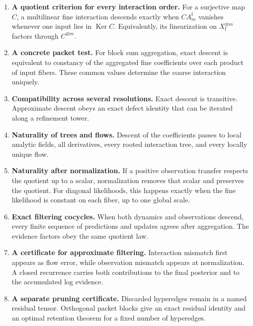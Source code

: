 \documentclass[11pt]{article}
\theoremstyle{definition}
\theoremstyle{remark}
\newcommand{\Ker}{\operatorname{Ker}}
\newcommand{\fine}{\mathrm f}
\begin{document}
\begin{enumerate}[label=\textbf{C\arabic*.},leftmargin=3.5em]
\item \textbf{A quotient criterion for every interaction order.}
For a surjective map $C$, a multilinear fine interaction descends exactly when $CA_m^{\fine}$ vanishes whenever one input lies in $\Ker C$.  Equivalently, its linearization on $X_{\fine}^{\otimes m}$ factors through $C^{\otimes m}$.

\item \textbf{A concrete packet test.}
For block sum aggregation, exact descent is equivalent to constancy of the aggregated fine coefficients over each product of input fibers.  These common values determine the coarse interaction uniquely.

\item \textbf{Compatibility across several resolutions.}
Exact descent is transitive.  Approximate descent obeys an exact defect identity that can be iterated along a refinement tower.

\item \textbf{Naturality of trees and flows.}
Descent of the coefficients passes to local analytic fields, all derivatives, every rooted interaction tree, and every locally unique flow.

\item \textbf{Naturality after normalization.}
If a positive observation transfer respects the quotient up to a scalar, normalization removes that scalar and preserves the quotient.  For diagonal likelihoods, this happens exactly when the fine likelihood is constant on each fiber, up to one global scale.

\item \textbf{Exact filtering cocycles.}
When both dynamics and observations descend, every finite sequence of predictions and updates agrees after aggregation.  The evidence factors obey the same quotient law.

\item \textbf{A certificate for approximate filtering.}
Interaction mismatch first appears as flow error, while observation mismatch appears at normalization.  A closed recurrence carries both contributions to the final posterior and to the accumulated log evidence.

\item \textbf{A separate pruning certificate.}
Discarded hyperedges remain in a named residual tensor.  Orthogonal packet blocks give an exact residual identity and an optimal retention theorem for a fixed number of hyperedges.
\end{enumerate}
\end{document}
